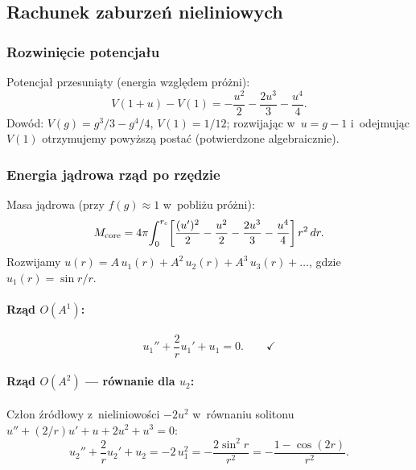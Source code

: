 \subsection{Rachunek zaburze\'n nieliniowych}

\subsubsection{Rozwinięcie potencja\l{}u}

Potencja\l{} przesuniąty (energia wzgl\k{e}dem pr\'o\.zni):
\begin{equation}\label{eq:R-V-sub}
  V(1+u) - V(1) = -\frac{u^2}{2} - \frac{2u^3}{3} - \frac{u^4}{4}.
\end{equation}
Dow\'od: $V(g) = g^3/3 - g^4/4$, $V(1) = 1/12$;
rozwijaj\k{a}c w~$u = g - 1$ i~odejmuj\k{a}c $V(1)$ otrzymujemy
powy\.zsz\k{a} posta\'c (potwierdzone algebraicznie).

\subsubsection{Energia j\k{a}drowa rz\k{a}d po rz\k{e}dzie}

Masa j\k{a}drowa (przy $f(g) \approx 1$ w~pobli\.zu pr\'o\.zni):
\begin{equation}\label{eq:R-Ecore-expansion}
  M_{\rm core} = 4\pi\!\int_0^{r_c}\!\left[
    \frac{(u')^2}{2} - \frac{u^2}{2}
    - \frac{2u^3}{3} - \frac{u^4}{4}
  \right]r^2\,dr.
\end{equation}
Rozwijamy $u(r) = A\,u_1(r) + A^2\,u_2(r) + A^3\,u_3(r) + \ldots$,
gdzie $u_1(r) = \sin r/r$.

\paragraph{Rz\k{a}d $O(A^1)$:}
\begin{equation}
  u_1'' + \frac{2}{r}u_1' + u_1 = 0.
  \qquad\checkmark
\end{equation}

\paragraph{Rz\k{a}d $O(A^2)$ --- r\'ownanie dla $u_2$:}
Cz\l{}on \'zr\'od\l{}owy z~nieliniowo\'sci $-2u^2$
w~r\'ownaniu solitonu $u'' + (2/r)u' + u + 2u^2 + u^3 = 0$:
\begin{equation}\label{eq:R-order2}
  u_2'' + \frac{2}{r}u_2' + u_2
  = -2\,u_1^2
  = -\frac{2\sin^2 r}{r^2}
  = -\frac{1 - \cos(2r)}{r^2}.
\end{equation}

